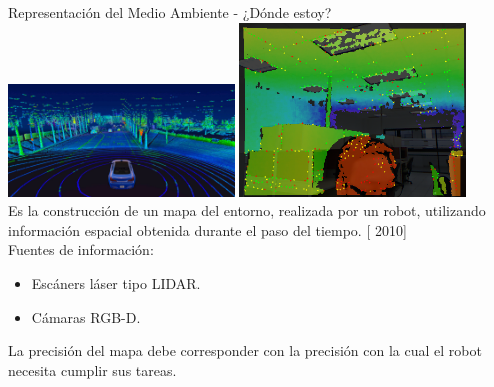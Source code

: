 \documentclass[
  24pt, %
  aspectratio=169, %
]{beamer}
\begin{document}
\begin{frame}{Representación del Medio Ambiente - ¿Dónde estoy?}
  \bigskip %
  \centering
  \includegraphics[width=0.45\textwidth,height=0.35\textheight]{map3d.jpg}
  \hfil
  \includegraphics[width=0.45\textwidth,height=0.35\textheight]{rgbd}
  \vspace{2pt}\\
  \bigskip %
  Es la construcción de un mapa del entorno, realizada por un robot, utilizando información espacial obtenida durante el paso del tiempo. [\citeauthor{Wallgrn2010} 2010]\\
  \bigskip %
  Fuentes de información:
  \begin{itemize}
  \item Escáners láser tipo LIDAR.
  \item Cámaras RGB-D.
  \end{itemize}  

  \bigskip %
  
  \tiny La precisión del mapa debe corresponder con la precisión con la cual el robot necesita cumplir sus tareas.
  
\end{frame}
\end{document}
